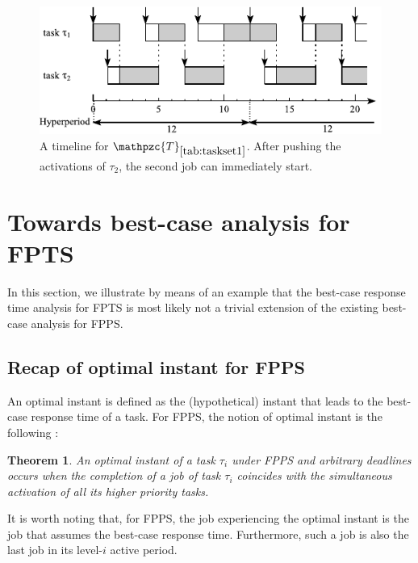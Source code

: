 \documentclass[conference,compsoc]{IEEEtran}
\newtheorem{theorem}{Theorem}
\newtheorem{conjecture}{Conjecture}
\begin{document}
\begin{figure}[h]
	\centering
	\includegraphics[width=1\linewidth]{fig/fpns2}
	\caption{A timeline for $\mathpzc{T}_{\ref{tab:taskset1}}$. After pushing the activations of $\tau_2$, the second job can immediately start.}
	\label{fig:fpns2}
\end{figure}

\section{Towards best-case analysis for FPTS}

In this section, we illustrate by means of an example that the best-case response time analysis for FPTS is most likely not a trivial extension of the existing best-case analysis for FPPS.
%
\subsection{Recap of optimal instant for FPPS}
An optimal instant is defined as the (hypothetical) instant that leads to the best-case response time of a task. For FPPS, the notion of optimal instant is the following \cite{BLM13}:
\begin{theorem}
	An optimal instant of a task $\tau_i$ under FPPS and arbitrary deadlines occurs when the completion of a job of task $\tau_i$ coincides with the simultaneous activation of all its higher priority tasks. 
\end{theorem}

It is worth noting that, for FPPS, the job experiencing the optimal instant is the job that assumes the best-case response time. Furthermore, such a job is also the last job in its level-$i$ active period.
%
%
\end{document}
